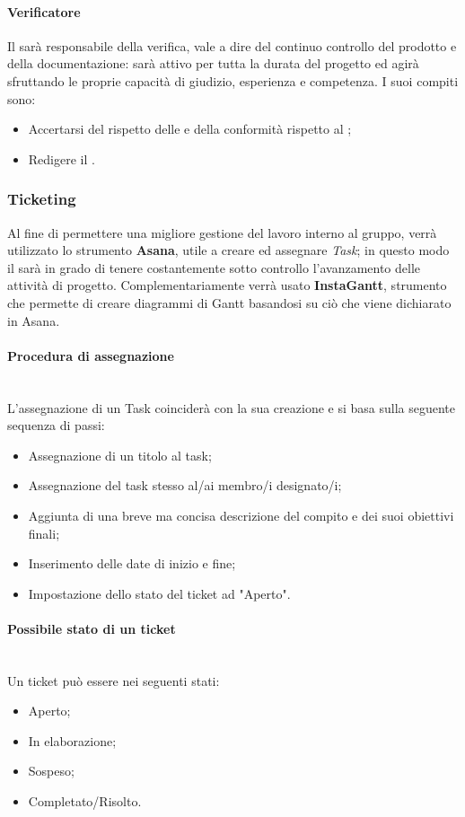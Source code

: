 \paragraph{Verificatore} \label{verificatore}
Il \ver{} sarà responsabile della verifica, vale a dire del continuo controllo del prodotto e della documentazione: sarà attivo per tutta la durata del progetto ed agirà sfruttando le proprie capacità di giudizio, esperienza e competenza. I suoi compiti sono:
\begin{itemize}
\item Accertarsi del rispetto delle \NdP{} e della conformità rispetto al \PdQ{};
\item Redigere il \PdQ{}.
\end{itemize}

\subsubsection{Ticketing}
Al fine di permettere una migliore gestione del lavoro interno al gruppo, verrà utilizzato lo strumento \textbf{Asana}, utile a creare ed assegnare \emph{Task}; in questo modo il \RdP  sarà in grado di tenere costantemente sotto controllo l'avanzamento delle attività di progetto. Complementariamente verrà usato \textbf{InstaGantt}, strumento che permette di creare diagrammi di Gantt basandosi su ciò che viene dichiarato in Asana.
\paragraph{Procedura di assegnazione}
~\\L'assegnazione di un Task coinciderà con la sua creazione e si basa sulla seguente sequenza di passi:
\begin{itemize}
\item Assegnazione di un titolo al task;
\item Assegnazione del task stesso al/ai membro/i designato/i;
\item Aggiunta di una breve ma concisa descrizione del compito e dei suoi obiettivi finali;
\item Inserimento delle date di inizio e fine;
\item Impostazione dello stato del ticket ad "Aperto".
\end{itemize}

\paragraph{Possibile stato di un ticket}
~\\Un ticket può essere nei seguenti stati:
\begin{itemize}
\item Aperto;
\item In elaborazione;
\item Sospeso;
\item Completato/Risolto.
\end{itemize}


